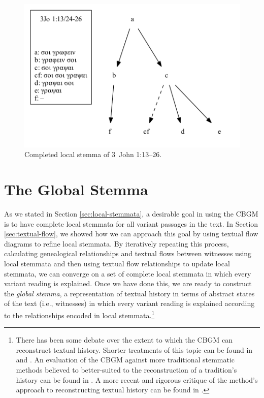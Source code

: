 \documentclass[a4paper, 12pt]{article}
\begin{document}
	\begin{figure}[h!]
		\centering
		\includegraphics[scale=0.6666]{../graphics/B25K1V13U24-26-local-stemma-completed.pdf}
		\caption{Completed local stemma of 3~John 1:13–26.}
		\label{fig:local-stemma-completed}
	\end{figure}
	
	\newpage
	
	\section{The Global Stemma}\label{sec:global-stemma}
	As we stated in Section \ref{sec:local-stemmata}, a desirable goal in using the CBGM is to have complete local stemmata for all variant passages in the text. In Section \ref{sec:textual-flow}, we showed how we can approach this goal by using textual flow diagrams to refine local stemmata. By iteratively repeating this process, calculating genealogical relationships and textual flows between witnesses using local stemmata and then using textual flow relationships to update local stemmata, we can converge on a set of complete local stemmata in which every variant reading is explained. Once we have done this, we are ready to construct the \emph{global stemma}, a representation of textual history in terms of abstract states of the text (i.e., witnesses) in which every variant reading is explained according to the relationships encoded in local stemmata.\footnote{There has been some debate over the extent to which the CBGM can reconstruct textual history. Shorter treatments of this topic can be found in \cite{Wachtel15} and \cite{Carlson15}. An evaluation of the CBGM against more traditional stemmatic methods believed to better-suited to the reconstruction of a tradition's history can be found in \cite{Edmondson19}. A more recent and rigorous critique of the method's approach to reconstructing textual history can be found in \cite{Carlson20}.}
	
\end{document}
